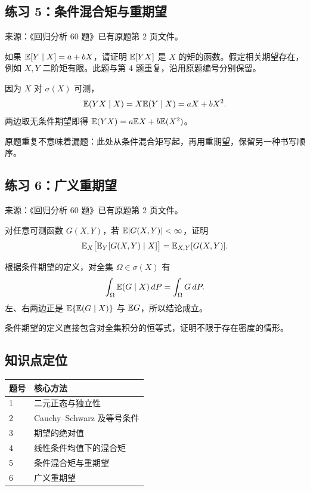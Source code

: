 \subsection*{练习 5：条件混合矩与重期望}
\begin{homework}[练习 5]
\textsf{来源：《回归分析 60 题》已有原题第 2 页文件。}\par
如果 $\mathbb{E}[Y\mid X]=a+bX$，请证明 $\mathbb{E}[YX]$ 是 $X$ 的矩的函数。假定相关期望存在，例如 $X,Y$ 二阶矩有限。此题与第 4 题重复，沿用原题编号分别保留。
\end{homework}
\begin{solution}
因为 $X$ 对 $\sigma(X)$ 可测，
\[
\mathbb{E}(YX\mid X)=X\mathbb{E}(Y\mid X)=aX+bX^2.
\]
两边取无条件期望即得 $\mathbb{E}(YX)=a\mathbb{E} X+b\mathbb{E}(X^2)$。
\end{solution}
\begin{dxtips}[条件混合矩与重期望]\label{hw:reg:tip:5}
原题重复不意味着漏题：此处从条件混合矩写起，再用重期望，保留另一种书写顺序。
\end{dxtips}

\subsection*{练习 6：广义重期望}
\begin{homework}[练习 6]
\textsf{来源：《回归分析 60 题》已有原题第 2 页文件。}\par
对任意可测函数 $G(X,Y)$，若 $\mathbb{E}|G(X,Y)|<\infty$，证明
\[\mathbb{E}_X\bigl[\mathbb{E}_Y[G(X,Y)\mid X]\bigr]=\mathbb{E}_{X,Y}[G(X,Y)].\]
\end{homework}
\begin{solution}
根据条件期望的定义，对全集 $\Omega\in\sigma(X)$ 有
\[
\int_\Omega \mathbb{E}(G\mid X)\,dP=\int_\Omega G\,dP.
\]
左、右两边正是 $\mathbb{E}\{\mathbb{E}(G\mid X)\}$ 与 $\mathbb{E} G$，所以结论成立。
\end{solution}
\begin{dxtips}[广义重期望]\label{hw:reg:tip:6}
条件期望的定义直接包含对全集积分的恒等式，证明不限于存在密度的情形。
\end{dxtips}

\subsection*{知识点定位}\begin{center}\begin{tabular}{ll}\toprule 题号 & 核心方法\\\midrule

1 & 二元正态与独立性 \\

2 & Cauchy--Schwarz 及等号条件 \\

3 & 期望的绝对值 \\

4 & 线性条件均值下的混合矩 \\

5 & 条件混合矩与重期望 \\

6 & 广义重期望 \\

\bottomrule\end{tabular}\end{center}
